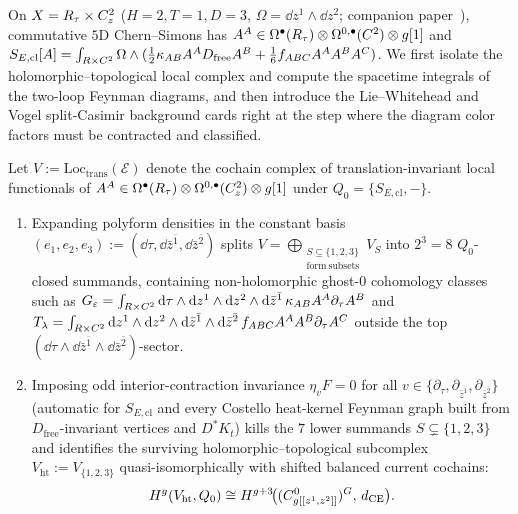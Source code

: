 On $X = R_\tau\times C^2_z$ ($H=2, T=1, D=3$, $\Omega = \dd z^1\wedge\dd z^2$; companion paper~\fivedpdf), commutative $5\mathrm{D}$ Chern--Simons has $A^A \in \Omega^\bullet(R_\tau)\otimes\Omega^{0,\bullet}(C^2)\otimes g[1]$ and $S_{E,\mathrm{cl}}[A] = \int_{R\times C^2}\Omega\wedge(\frac{1}{2}\kappa_{AB}A^A D_{\mathrm{free}}A^B + \frac{1}{6}f_{ABC}A^AA^BA^C)$. We first isolate the holomorphic--topological local complex and compute the spacetime integrals of the two-loop Feynman diagrams, and then introduce the Lie--Whitehead and Vogel split-Casimir background cards right at the step where the diagram color factors must be contracted and classified.

\begin{lemma}
\label{lem:5d-cs-8summands}
Let $V := \mathrm{Loc}_{\mathrm{trans}}(\mathcal{E})$ denote the cochain complex of translation-invariant local functionals of $A^A \in \Omega^\bullet(R_\tau)\otimes\Omega^{0,\bullet}(C^2_z)\otimes g[1]$ under $Q_0 = \{S_{E,\mathrm{cl}}, -\}$.
\begin{enumerate}[label=(\arabic*),leftmargin=*]
  \item Expanding polyform densities in the constant basis $(e_1,e_2,e_3) := (\dd\tau, \dd\bar{z}^{\bar{1}}, \dd\bar{z}^{\bar{2}})$ splits $V = \bigoplus_{\substack{S\subseteq\{1,2,3\}\\\mathrm{form\ subsets}}}V_S$ into $2^3 = 8$ $Q_0$-closed summands, containing non-holomorphic ghost-$0$ cohomology classes such as $G_\varepsilon = \int_{R\times C^2}\mathrm{d}\tau\wedge\mathrm{d} z^1\wedge\mathrm{d} z^2\wedge\mathrm{d}\bar{z}^{\bar{1}}\,\kappa_{AB}A^A\partial_\tau A^B$ and $T_\lambda = \int_{R\times C^2}\mathrm{d} z^1\wedge\mathrm{d} z^2\wedge\mathrm{d}\bar{z}^{\bar{1}}\wedge\mathrm{d}\bar{z}^{\bar{2}}\,f_{ABC}A^AA^B\partial_\tau A^C$ outside the top $(\dd\tau\wedge\dd\bar{z}^{\bar{1}}\wedge\dd\bar{z}^{\bar{2}})$-sector.

  \item Imposing odd interior-contraction invariance $\eta_v F = 0$ for all $v \in \{\partial_\tau, \partial_{\bar{z}^{\bar{1}}}, \partial_{\bar{z}^{\bar{2}}}\}$ (automatic for $S_{E,\mathrm{cl}}$ and every Costello heat-kernel Feynman graph built from $D_{\mathrm{free}}$-invariant vertices and $D^* K_t$) kills the $7$ lower summands $S \subsetneq \{1,2,3\}$ and identifies the surviving holomorphic--topological subcomplex $V_{\mathrm{ht}} := V_{\{1,2,3\}}$ quasi-isomorphically with shifted balanced current cochains:
  \begin{equation}
  \label{eq:5d-vht-iso}
  H^g(V_{\mathrm{ht}}, Q_0) \cong H^{g+3}\!\bigl((C^0_{g[[z^1,z^2]]})^G,\, d_{\mathrm{CE}}\bigr).
  \end{equation}
\end{enumerate}
\end{lemma}


